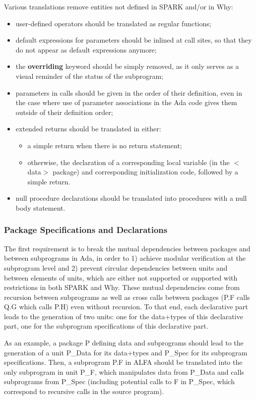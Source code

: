 \documentclass{article}
\newcounter{example}
\newcommand{\kw}[1]{\textbf{#1}}
\begin{document}
Various translations remove entities not defined in SPARK and/or in Why:
\begin{itemize}
\item user-defined operators should be translated as regular functions;
\item default expressions for parameters should be inlined at call sites, so
  that they do not appear as default expressions anymore;
\item the \kw{overriding} keyword should be simply removed, as it only serves
  as a visual reminder of the status of the subprogram;
\item parameters in calls should be given in the order of their definition,
  even in the case where use of parameter associations in the Ada code gives
  them outside of their definition order;
\item extended returns should be translated in either:
  \begin{itemize}
  \item a simple return when there is no return statement;
  \item otherwise, the declaration of a corresponding local variable (in the
    $<$data$>$ package) and corresponding initialization code, followed by a
    simple return.
  \end{itemize}
\item null procedure declarations should be translated into procedures with a
  null body statement.
\end{itemize}

\subsubsection{Package Specifications and Declarations}

The first requirement is to break the mutual dependencies between packages and
between subprograms in Ada, in order to 1) achieve modular verification at the
subprogram level and 2) prevent circular dependencies between units and between
elements of units, which are either not supported or supported with
restrictions in both SPARK and Why. These mutual dependencies come from
recursion between subprograms as well as cross calls between packages (P.F
calls Q.G which calls P.H) even without recursion. To that end, each
declarative part leads to the generation of two units: one for the data+types
of this declarative part, one for the subprogram specifications of this
declarative part.

As an example, a package P defining data and subprograms should lead to the
generation of a unit P\_Data for its data+types and P\_Spec for its subprogram
specifications. Then, a subprogram P.F in ALFA should be translated into the
only subprogram in unit P\_F, which manipulates data from P\_Data and calls
subprograms from P\_Spec (including potential calls to F in P\_Spec, which
correspond to recursive calls in the source program).
\end{document}
